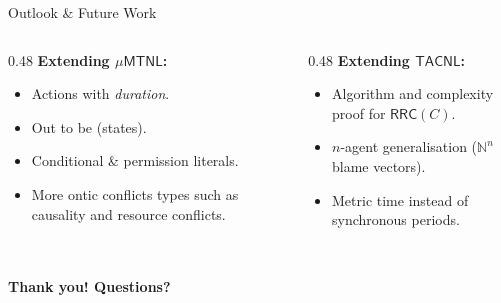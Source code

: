 \documentclass[9pt,aspectratio=169]{beamer}
\newcommand{\logic}[1]{\ensuremath{\mathsf{#1}}\xspace}
\newcommand{\TDDLfm}{\logic{\mu MTNL}}
\newcommand{\cDL}{\logic{TACNL}}
\newcommand{\rrcs}[1]{\ensuremath{\mathsf{RRC}\!\left(#1\right)}\xspace}
\begin{document}
\begin{frame}{Outlook \& Future Work}
\begin{columns}[T]
\begin{column}{0.48\textwidth}
  \textbf{Extending $\TDDLfm$:}
  \begin{itemize}
    \item Actions with \emph{duration}.
    \item Out to be (states).
    \item Conditional \& permission literals.
    \item More ontic conflicts types such as causality and resource conflicts.
  \end{itemize}
\end{column}
\begin{column}{0.48\textwidth}
  \textbf{Extending \cDL:}
  \begin{itemize}
    \item Algorithm and complexity proof for $\rrcs{C}$.
    \item $n$-agent generalisation ($\mathbb{N}^n$ blame vectors).
    \item Metric time instead of synchronous periods.
  \end{itemize}
\end{column}
\end{columns}

\vspace{3mm}
\centering
\vspace{1mm}
{\Large\bfseries \\Thank you! \quad Questions?}
\end{frame}

\appendix
\end{document}
